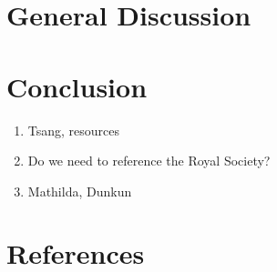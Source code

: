 \documentclass[10pt]{iopart}
\begin{document}

\section{General Discussion}



\section{Conclusion}

\ack

\begin{enumerate}
	\item Tsang, resources
	\item Do we need to reference the Royal Society?
	\item Mathilda, Dunkun
\end{enumerate}

\section*{References}


\end{document}
